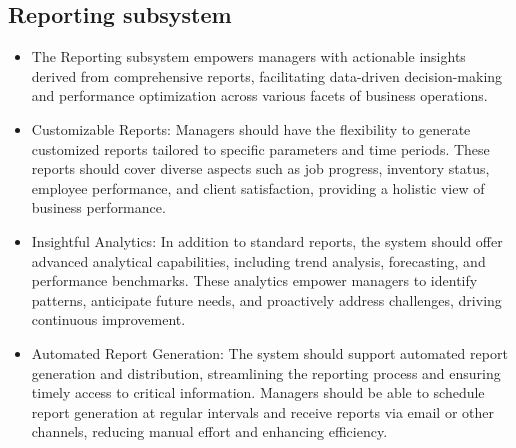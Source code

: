 \documentclass{article}
\begin{document}
	\subsection*{Reporting subsystem}	
	\begin{itemize}
	    \item The Reporting subsystem empowers managers with actionable insights derived from comprehensive reports, facilitating data-driven decision-making and performance optimization across various facets of business operations.
	    \item Customizable Reports: Managers should have the flexibility to generate customized reports tailored to specific parameters and time periods. These reports should cover diverse aspects such as job progress, inventory status, employee performance, and client satisfaction, providing a holistic view of business performance.
	    \item Insightful Analytics: In addition to standard reports, the system should offer advanced analytical capabilities, including trend analysis, forecasting, and performance benchmarks. These analytics empower managers to identify patterns, anticipate future needs, and proactively address challenges, driving continuous improvement.
	    \item Automated Report Generation: The system should support automated report generation and distribution, streamlining the reporting process and ensuring timely access to critical information. Managers should be able to schedule report generation at regular intervals and receive reports via email or other channels, reducing manual effort and enhancing efficiency.
	\end{itemize}
\end{document}
